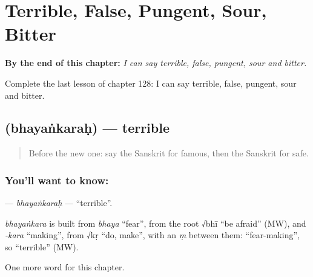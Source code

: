 
\chapter{Terrible, False, Pungent, Sour, Bitter}
\label{ch:sa-terrible-false-pungent-sour-bitter}

\begin{chapteropening}
\textbf{By the end of this chapter:} \emph{I can say terrible, false, pungent, sour and bitter.}

Complete the last lesson of chapter 128: I can say terrible, false, pungent, sour and bitter.
\end{chapteropening}

\section[\texorpdfstring{\sk{भयंकरः} (bhayaṅkaraḥ)}{भयंकरः (bhayaṅkaraḥ)}]{ (bhayaṅkaraḥ) — terrible}

\label{lesson:SA-C128-bhayankarah}



\begin{quote}
Before the new one: say the Sanskrit for famous, then the Sanskrit for safe.
\end{quote}

\subsection*{You'll want to know: }
\textbf{} — \emph{bhayaṅkaraḥ} — \textquotedblleft{}terrible\textquotedblright{}.

\begin{cousinweb}
\emph{bhayaṅkara} is built from \emph{bhaya} \textquotedblleft{}fear\textquotedblright{}, from the root √bhī \textquotedblleft{}be afraid\textquotedblright{} (MW), and \emph{-kara} \textquotedblleft{}making\textquotedblright{}, from √kṛ \textquotedblleft{}do, make\textquotedblright{}, with an \emph{ṃ} between them: \textquotedblleft{}fear-making\textquotedblright{}, so \textquotedblleft{}terrible\textquotedblright{} (MW).
\end{cousinweb}

\begin{grammarlens}[title={What you've built}]
One more word for this chapter.
\end{grammarlens}

